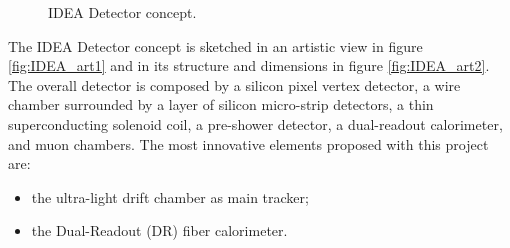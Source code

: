 \begin{figure}
	\centering
	 \quad
	\caption{IDEA Detector concept.}
\end{figure}

The IDEA Detector concept is sketched in an artistic view in figure \ref{fig:IDEA_art1} and in its structure and dimensions in figure \ref{fig:IDEA_art2}. 
The overall detector is composed by a silicon pixel vertex detector, a wire chamber surrounded by a layer of silicon micro-strip detectors, a thin superconducting solenoid coil, a pre-shower detector, a dual-readout calorimeter, and muon chambers.
The most innovative elements proposed with this project are:
\begin{itemize}
  \item the ultra-light drift chamber as main tracker;
  \item the Dual-Readout (DR) fiber calorimeter.
\end{itemize}

